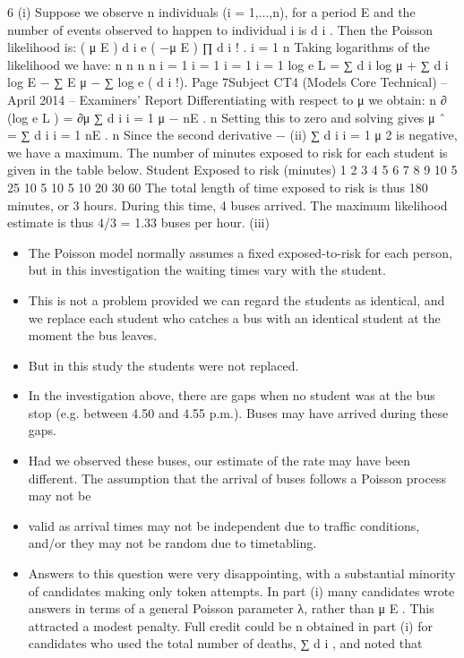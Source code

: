 \documentclass[a4paper,12pt]{article}
\begin{document}
\begin{enumerate}
6
(i)
Suppose we observe n individuals (i = 1,...,n), for a period E and the number
of events observed to happen to individual i is d i .
Then the Poisson likelihood is:
( μ E ) d i e ( −μ E )
∏ d i ! .
i = 1
n
Taking logarithms of the likelihood we have:
n n n n
i = 1 i = 1 i = 1 i = 1
log e L = ∑ d i log μ + ∑ d i log E − ∑ E μ − ∑ log e ( d i !).
Page 7Subject CT4 (Models Core Technical) – April 2014 – Examiners’ Report
Differentiating with respect to μ we obtain:
n
∂ (log e L )
=
∂μ
∑ d i
i = 1
μ
− nE .
n
Setting this to zero and solving gives μ ˆ =
∑ d i
i = 1
nE
.
n
Since the second derivative −
(ii)
∑ d i
i = 1
μ 2
is negative, we have a maximum.
The number of minutes exposed to risk for each student is given in the table
below.
Student Exposed to risk (minutes)
1
2
3
4
5
6
7
8
9
10 5
25
10
5
10
5
10
20
30
60
The total length of time exposed to risk is thus 180 minutes, or 3 hours.
During this time, 4 buses arrived.
The maximum likelihood estimate is thus 4/3 = 1.33 buses per hour.
(iii)
\begin{itemize}
\item The Poisson model normally assumes a fixed exposed-to-risk for each person, but in this investigation the waiting times vary with the student.
\item This is not a problem provided we can regard the students as identical, and we replace each student who catches a bus with an identical student at the moment the bus leaves.
\item But in this study the students were not replaced.
\item In the investigation above, there are gaps when no student was at the bus stop (e.g. between 4.50 and 4.55 p.m.). Buses may have arrived during these gaps.
\item 
Had we observed these buses, our estimate of the rate may have been different.
The assumption that the arrival of buses follows a Poisson process may not be
\item valid as arrival times may not be independent due to traffic conditions, and/or
they may not be random due to timetabling.
\item Answers to this question were very disappointing, with a substantial minority of candidates
making only token attempts. In part (i) many candidates wrote answers in terms of a general
Poisson parameter λ, rather than μ E . This attracted a modest penalty. Full credit could be
n
obtained in part (i) for candidates who used the total number of deaths, ∑ d i , and noted that

\end{itemize}
\end{enumerate}
\end{document}
